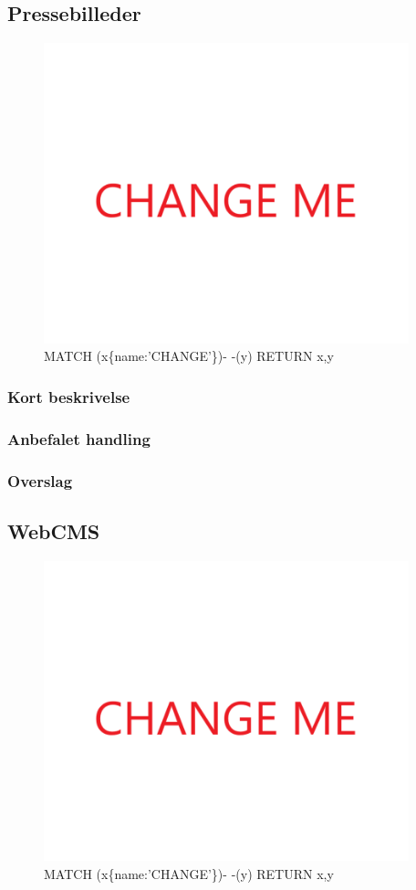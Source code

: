 \documentclass{article}
\begin{document}
\subsection{Pressebilleder}
\begin{figure}[h]
\includegraphics[width=300pt]{CHANGE.PNG}
\caption{MATCH (x\{name:'CHANGE'\})- -(y) RETURN x,y}
\end{figure}
\subsubsection{Kort beskrivelse}
\subsubsection{Anbefalet handling}
\subsubsection{Overslag}


\subsection{WebCMS}
\begin{figure}[h]
\includegraphics[width=300pt]{CHANGE.PNG}
\caption{MATCH (x\{name:'CHANGE'\})- -(y) RETURN x,y}
\end{figure}
\end{document}
